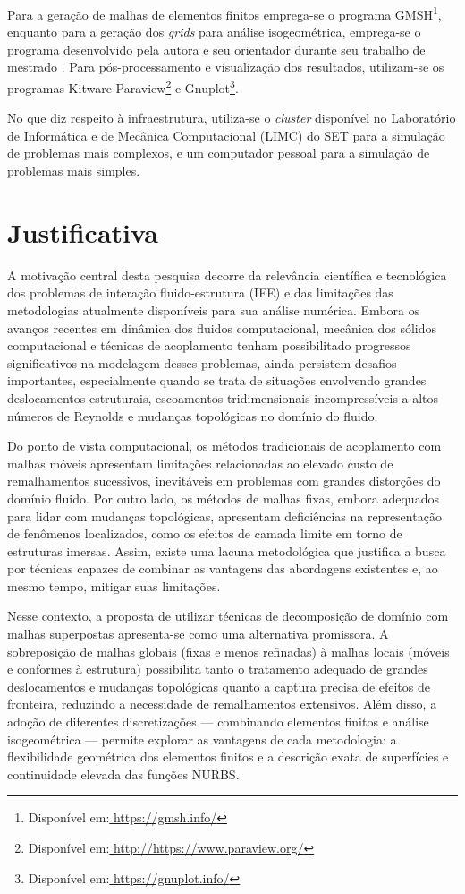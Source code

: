 Para a geração de malhas de elementos finitos emprega-se o programa GMSH\footnote{Disponível em:\url{ https://gmsh.info/}}, enquanto para a  geração dos \textit{grids} para análise isogeométrica, emprega-se o programa desenvolvido pela autora e seu orientador durante seu trabalho de mestrado \cite{Tonon:2016}. Para pós-processamento e visualização dos resultados, utilizam-se os programas Kitware Paraview\footnote{Disponível em:\url{ http://https://www.paraview.org/}} e  Gnuplot\footnote{Disponível em:\url{ https://gnuplot.info/}}. 

No que diz respeito à infraestrutura, utiliza-se o \textit{cluster} disponível no Laboratório de Informática e de Mecânica Computacional (LIMC) do SET para a simulação de problemas mais complexos, e um computador pessoal para a simulação de problemas mais simples.

\section[Justificativa]{Justificativa}

A motivação central desta pesquisa decorre da relevância científica e tecnológica dos problemas de interação fluido-estrutura (IFE) e das limitações das metodologias atualmente disponíveis para sua análise numérica. Embora os avanços recentes em dinâmica dos fluidos computacional, mecânica dos sólidos computacional e técnicas de acoplamento tenham possibilitado progressos significativos na modelagem desses problemas, ainda persistem desafios importantes, especialmente quando se trata de situações envolvendo grandes deslocamentos estruturais, escoamentos tridimensionais incompressíveis a altos números de Reynolds e mudanças topológicas no domínio do fluido.
	
Do ponto de vista computacional, os métodos tradicionais de acoplamento com malhas móveis apresentam limitações relacionadas ao elevado custo de remalhamentos sucessivos, inevitáveis em problemas com grandes distorções do domínio fluido. Por outro lado, os métodos de malhas fixas, embora adequados para lidar com mudanças topológicas, apresentam deficiências na representação de fenômenos localizados, como os efeitos de camada limite em torno de estruturas imersas. Assim, existe uma lacuna metodológica que justifica a busca por técnicas capazes de combinar as vantagens das abordagens existentes e, ao mesmo tempo, mitigar suas limitações.
	
Nesse contexto, a proposta de utilizar técnicas de decomposição de domínio com malhas superpostas apresenta-se como uma alternativa promissora. A sobreposição de malhas globais (fixas e menos refinadas) à malhas locais (móveis e conformes à estrutura) possibilita tanto o tratamento adequado de grandes deslocamentos e mudanças topológicas quanto a captura precisa de efeitos de fronteira, reduzindo a necessidade de remalhamentos extensivos. Além disso, a adoção de diferentes discretizações — combinando elementos finitos e análise isogeométrica — permite explorar as vantagens de cada metodologia: a flexibilidade geométrica dos elementos finitos e a descrição exata de superfícies e continuidade elevada das funções NURBS.


